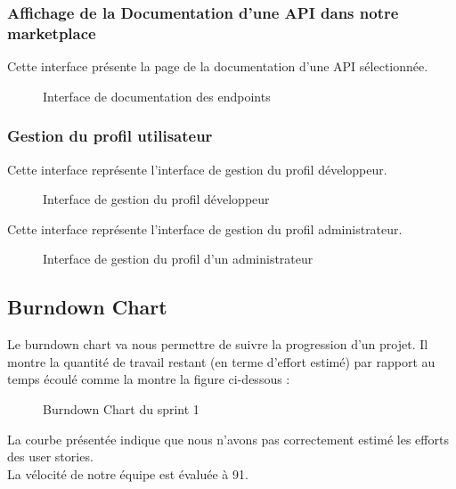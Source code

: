     \subsubsection{Affichage de la Documentation d'une API dans notre marketplace }	
    
    Cette interface présente la page de la documentation d'une API sélectionnée.
    \begin{figure}[H]
        \centering
        \caption{Interface de documentation des endpoints}
        \label{fig:logo_tt}
    \end{figure}
    \pagebreak

    \subsubsection{Gestion du profil utilisateur}	
	Cette interface représente l'interface de gestion du profil développeur.
    \begin{figure}[H]
        \centering
        \caption{Interface de gestion du profil développeur}
        \label{fig:logo_tt}
    \end{figure}  
        Cette interface représente l'interface de gestion du profil administrateur.
        \begin{figure}[H]
            \centering
            \caption{Interface de gestion du profil d'un administrateur}
            \label{fig:logo_tt}
        \end{figure}

        \subsection{Burndown Chart}	               
        Le burndown chart va nous permettre de suivre la progression d'un projet. Il montre la quantité de travail restant (en terme d'effort estimé) par rapport au temps écoulé comme la montre la figure ci-dessous :
        \begin{figure}[H]
            \centering
            \caption{Burndown Chart du sprint 1}
            \label{fig:logo_tt}
        \end{figure}
        
        La courbe présentée indique que nous n'avons pas correctement estimé les efforts des user stories. \\
        La vélocité de notre équipe est évaluée à 91.

